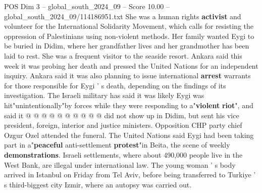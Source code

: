 \begin{textsample}{POS Dim 3 – global\_south\_2024\_09 – Score 10.00 – global\_south\_2024\_09/114186951.txt}
She was a human rights \textbf{activist} and volunteer for the International Solidarity Movement, which calls for resisting the oppression of Palestinians using non-violent methods.
Her family wanted Eygi to be buried in Didim, where her grandfather lives and her grandmother has been laid to rest.
She was a frequent visitor to the seaside resort.
Ankara said this week it was probing her death and pressed the United Nations for an independent inquiry.
Ankara said it was also planning to issue international \textbf{arrest} warrants for those responsible for Eygi ' s death, depending on the findings of its investigation.
The Israeli military has said it was likely Eygi was hit"unintentionally"by forces while they were responding to a"\textbf{violent} \textbf{riot}", and said it @ @ @ @ @ @ @ @ @ @ did not show up in Didim, but sent his vice president, foreign, interior and justice ministers.
Opposition CHP party chief Ozgur Ozel attended the funeral.
The United Nations said Eygi had been taking part in a"\textbf{peaceful} anti-settlement \textbf{protest}"in Beita, the scene of weekly \textbf{demonstrations}.
Israeli settlements, where about 490,000 people live in the West Bank, are illegal under international law.
The young woman ' s body arrived in Istanbul on Friday from Tel Aviv, before being transferred to Turkiye ' s third-biggest city Izmir, where an autopsy was carried out.

\end{textsample}
